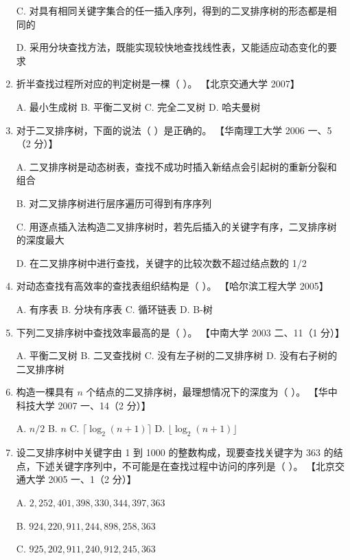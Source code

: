 \documentclass[lang=cn,newtx,10pt,scheme=chinese]{elegantbook}
\begin{document}
\begin{enumerate}
    C. 对具有相同关键字集合的任一插入序列，得到的二叉排序树的形态都是相同的  

    D. 采用分块查找方法，既能实现较快地查找线性表，又能适应动态变化的要求  

    \item 折半查找过程所对应的判定树是一棵（ ）。  
    【北京交通大学 2007】  

    A. 最小生成树 \quad B. 平衡二叉树 \quad C. 完全二叉树 \quad D. 哈夫曼树  

    \item 对于二叉排序树，下面的说法（ ）是正确的。  
    【华南理工大学 2006 一、5（2 分）】  

    A. 二叉排序树是动态树表，查找不成功时插入新结点会引起树的重新分裂和组合  

    B. 对二叉排序树进行层序遍历可得到有序序列  

    C. 用逐点插入法构造二叉排序树时，若先后插入的关键字有序，二叉排序树的深度最大  

    D. 在二叉排序树中进行查找，关键字的比较次数不超过结点数的 1/2  

    \item 对动态查找有高效率的查找表组织结构是（ ）。  
    【哈尔滨工程大学 2005】  

    A. 有序表 \quad B. 分块有序表 \quad C. 循环链表 \quad D. B-树  

    \item 下列二叉排序树中查找效率最高的是（ ）。  
    【中南大学 2003 二、11（1 分）】  

    A. 平衡二叉树 \quad B. 二叉查找树 \quad C. 没有左子树的二叉排序树 \quad D. 没有右子树的二叉排序树  

    \item 构造一棵具有 $n$ 个结点的二叉排序树，最理想情况下的深度为（ ）。  
    【华中科技大学 2007 一、14（2 分）】 

    A. $n/2$ \quad B. $n$ \quad C. $\lceil \log_2(n+1) \rceil$ \quad D. $\lfloor \log_2(n+1) \rfloor$  

    \item 设二叉排序树中关键字由 1 到 1000 的整数构成，现要查找关键字为 363 的结点，下述关键字序列中，不可能是在查找过程中访问的序列是（ ）。  
    【北京交通大学 2005 一、1（2 分）】  

    A. $2, 252, 401, 398, 330, 344, 397, 363$  

    B. $924, 220, 911, 244, 898, 258, 363$  

    C. $925, 202, 911, 240, 912, 245, 363$  


\end{enumerate}
\end{document}
